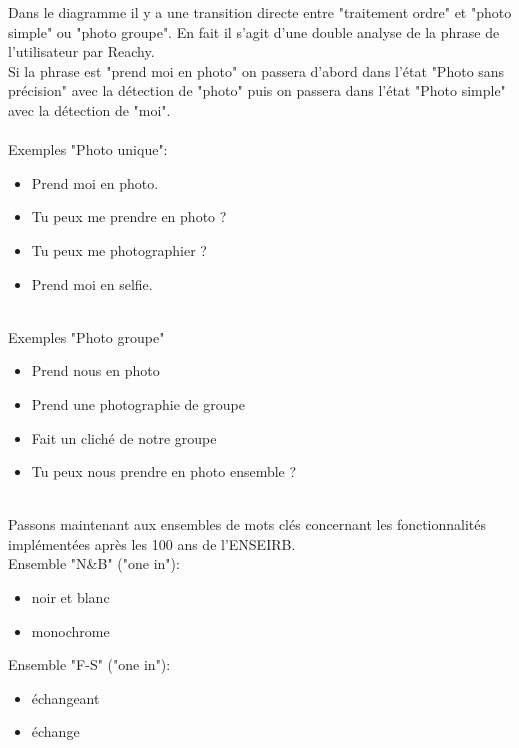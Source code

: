 Dans le diagramme il y a une transition directe entre "traitement ordre" et "photo simple" ou "photo groupe". En fait il s'agit d'une double analyse de la phrase de l'utilisateur par Reachy.
\\
Si la phrase est "prend moi en photo" on passera d'abord dans l'état "Photo sans précision" avec la détection de "photo" puis on passera dans l'état "Photo simple" avec la détection de "moi". \\
\ \\
Exemples "Photo unique":
\begin{itemize}
    \item Prend {\color{red}moi} en {\color{red}photo}.
    \item Tu peux {\color{red}me} prendre en {\color{red}photo} ? 
    \item Tu peux {\color{red}me photographier} ?
    \item Prend {\color{red}moi} en {\color{red}selfie}.
\end{itemize}
\ \\
Exemples "Photo groupe"
\begin{itemize}
    \item Prend {\color{red}nous} en {\color{red}photo}
    \item Prend une {\color{red}photographie} de {\color{red}groupe}
    \item Fait un {\color{red}cliché} de notre {\color{red}groupe}
    \item Tu peux nous {\color{red}prendre} en photo {\color{red}ensemble} ?
\end{itemize}
\ \\
Passons maintenant aux ensembles de mots clés concernant les fonctionnalités implémentées après les 100 ans de l'ENSEIRB. \\

Ensemble "N\&B" {\color{red}("one in")}:
\begin{itemize}
    \item noir et blanc
    \item monochrome \\
\end{itemize}

Ensemble "F-S" {\color{red}("one in")}:
\begin{itemize}
    \item échangeant
    \item échange \\
\end{itemize}

